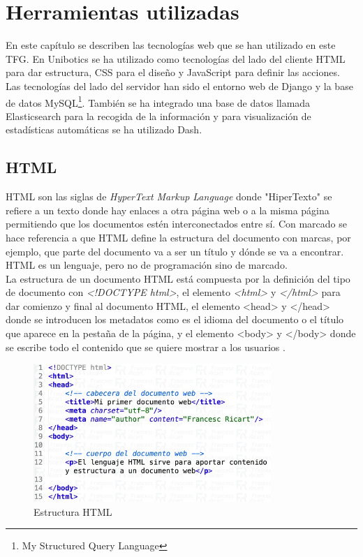 \chapter{Herramientas utilizadas}
\label{herramientas}
En este capítulo se describen las tecnologías web que se han utilizado en este TFG. En Unibotics se ha utilizado como tecnologías del lado del cliente HTML para dar estructura, CSS para el diseño y JavaScript para definir las acciones. Las tecnologías del lado del servidor han sido el entorno web de Django y la base de datos MySQL\footnote{My Structured Query Language}. También se ha integrado una base de datos llamada Elasticsearch para la recogida de la información y para visualización de estadísticas automáticas se ha utilizado Dash.

\section{HTML}
HTML son las siglas de \textit{HyperText Markup Language} donde "HiperTexto" se refiere a un texto donde hay enlaces a otra página web o a la misma página permitiendo que los documentos estén interconectados entre sí. Con marcado se hace referencia a que HTML define la estructura del documento con marcas, por ejemplo, que parte del documento va a ser un título y dónde se va a encontrar. HTML es un lenguaje, pero no de programación sino de marcado.\\

La estructura de un documento HTML está compuesta por la definición del tipo de documento con \textit{\textless!DOCTYPE html\textgreater}, el elemento  \textit{\textless html\textgreater} y \textit{\textless/html\textgreater} para dar comienzo y final al documento HTML, el elemento {\textless head\textgreater} y {\textless/head\textgreater} donde se introducen los metadatos como es el idioma del documento o el título que aparece en la pestaña de la página, y el elemento {\textless body\textgreater} y {\textless/body\textgreater} donde se escribe todo el contenido que se quiere mostrar a los usuarios \cite{html}.

\begin{figure}[H]
    \centering
    \includegraphics[width=9cm, keepaspectratio]{img/html.jpg}
    \caption{Estructura HTML}
    \label{fig:html}
\end{figure}

